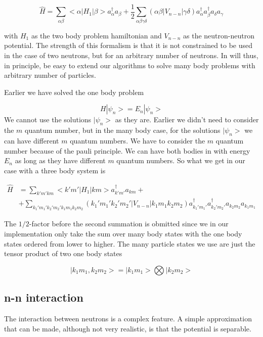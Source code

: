 \documentclass[12pt,a4paper]{article}
\begin{document}
\begin{equation}
\hat{H} =
\sum_{\alpha \beta} <\alpha| H_1 |\beta> a_{\alpha}^{\dagger} a_{\beta} + \frac{1}{2}\sum_{\alpha \beta \gamma \delta} ( \alpha \beta| V_{n-n} | \gamma \delta ) a_{\alpha}^{\dagger} a_{\beta}^{\dagger} a_{\delta} a_{\gamma}
\end{equation}

with $H_1$ as the two body problem hamiltonian and $V_{n-n}$ as the neutron-neutron potential. The strength of this formalism is that it is not constrained to be used in the case of two neutrons, but for an arbitrary number of neutrons. In will thus, in principle, be easy to extend our algorithms to solve many body problems with arbitrary number of particles. 

Earlier we have solved the one body problem

\begin{equation}
H | \psi_n > = E_n | \psi_n >
\end{equation}
We cannot use the solutions $| \psi_n>$ as they are. Earlier we didn't need to consider the $m$ quantum number, but in the many body case, for the solutions $| \psi_n>$ we can have different $m$ quantum numbers. We have to consider the $m$ quantum number because of the pauli principle. We can have both bodies in with energy $E_n$ as long as they have different $m$ quantum numbers. So what we get in our case with a three body system is

\begin{align}
\hat{H} &= \sum_{k' m' k m } <k'm'| H_1 |km> a_{k'm'}^{\dagger} a_{km} + \\
& + \sum_{k_1' m_1' k_2' m_2' k_1 m_1 k_2 m_2} ( k_1' m_1' k_2' m_2'| V_{n-n} | k_1 m_1 k_2 m_2 ) a_{k_1' m_1'}^{\dagger} a_{k_2' m_2'}^{\dagger} a_{k_2 m_2} a_{k_1 m_1}\label{two-body op sum}
\end{align}

The $1/2$-factor before the second summation is obmitted since we in our implementation only take the sum over many body states with the one body states ordered from lower to higher. The many particle states we use are just the tensor product of two one body states

\begin{equation}
|k_1 m_1 , k_2 m_2 > = |k_1 m_1> \bigotimes |k_2 m_2 >
\end{equation}

\subsection{n-n interaction}
The interaction between neutrons is a complex feature. A simple approximation that can be made, although not very realistic, is that the potential is separable. 
\end{document}
